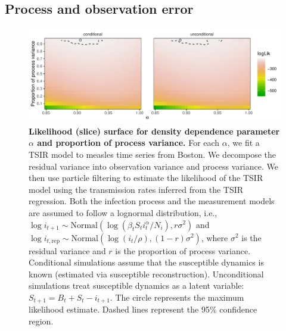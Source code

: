 \documentclass{article}
\begin{document}
\pagebreak
\subsection{Process and observation error}

\begin{figure}[!h]
\includegraphics[width=\textwidth]{../figure/compare_conditional_likelihood.pdf}
\caption{
\textbf{Likelihood (slice) surface for density dependence parameter $\alpha$ and proportion of process variance.}
For each $\alpha$, we fit a TSIR model to measles time series from Boston.
We decompose the residual variance into observation variance and process variance.
We then use particle filtering to estimate the likelihood of the TSIR model using the transmission rates inferred from the TSIR regression.
Both the infection process and the measurement models are assumed to follow a lognormal distribution, i.e., $\log i_{t+1} \sim \mathrm{Normal}(\log (\beta_t S_t i_t^\alpha/N_i), r \sigma^2)$ and $\log i_{t, \textrm{rep}} \sim \mathrm{Normal}(\log (i_{t}/\rho) , (1-r) \sigma^2)$, where $\sigma^2$ is the residual variance and $r$ is the proportion of process variance.
Conditional simulations assume that the susceptible dynamics is known (estimated via susceptible reconstruction).
Unconditional simulations treat susceptible dynamics as a latent variable: $S_{t+1} = B_t + S_t - i_{t+1}$.
The circle represents the maximum likelihood estimate.
Dashed lines represent the 95\% confidence region.
}
\end{figure}
\end{document}
